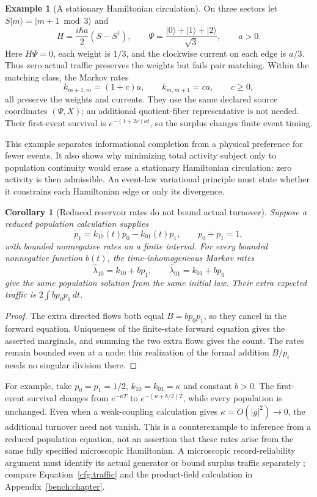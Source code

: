 \documentclass[11pt,oneside,openany]{book}
\newtheorem{corollary}[theorem]{Corollary}
\theoremstyle{definition}
\newtheorem{example}[theorem]{Example}
\theoremstyle{remark}\newtheorem{remark}[theorem]{Remark}
\begin{document}
\begin{example}[A stationary Hamiltonian circulation]\label{stat:ring}
On three sectors let $S|m\rangle=|m+1\bmod3\rangle$ and
\begin{equation}\label{stat:ring-hamiltonian}
 H=\frac{i\hbar a}{2}(S-S^\dagger),\qquad
 \Psi=\frac{|0\rangle+|1\rangle+|2\rangle}{\sqrt3},\qquad a>0.
\end{equation}
Here $H\Psi=0$, each weight is $1/3$, and the clockwise current on each
edge is $a/3$. Thus zero actual traffic preserves the weights but fails pair
matching. Within the matching class, the Markov rates
\begin{equation}\label{stat:ring-surplus}
 k_{m+1,m}=(1+c)a,\qquad k_{m,m+1}=ca,\qquad c\geq0,
\end{equation}
all preserve the weights and currents. They use the same declared source
coordinates $(\Psi,X)$; an additional quotient-fiber representative is not
needed. Their first-event survival is $e^{-(1+2c)at}$, so the surplus changes
finite event timing.
\end{example}

This example separates informational completion from a physical preference
for fewer events. It also shows why minimizing total activity subject only
to population continuity would erase a stationary Hamiltonian circulation:
zero activity is then admissible. An event-law variational principle must
state whether it constrains each Hamiltonian edge or only its divergence.

\begin{corollary}[Reduced reservoir rates do not bound actual turnover]
\label{stat:reservoir-turnover}
Suppose a reduced population calculation supplies
\[
 \dot p_1=k_{10}(t)p_0-k_{01}(t)p_1,\qquad p_0+p_1=1,
\]
with bounded nonnegative rates on a finite interval. For every bounded
nonnegative function $b(t)$, the time-inhomogeneous Markov rates
\[
 \widehat\lambda_{10}=k_{10}+b p_1,\qquad
 \widehat\lambda_{01}=k_{01}+b p_0
\]
give the same population solution from the same initial law. Their extra
expected traffic is $2\int b p_0p_1\,dt$.
\end{corollary}
\begin{proof}
The extra directed flows both equal $B=b p_0p_1$, so they cancel in the
forward equation. Uniqueness of the finite-state forward equation gives
the asserted marginals, and summing the two extra flows gives the count.
The rates remain bounded even at a node: this realization of the formal
addition $B/p_i$ needs no singular division there.
\end{proof}
For example, take $p_0=p_1=1/2$, $k_{10}=k_{01}=\kappa$ and constant
$b>0$. The first-event survival changes from $e^{-\kappa T}$ to
$e^{-(\kappa+b/2)T}$, while every population is unchanged. Even when a
weak-coupling calculation gives $\kappa=O(|g|^2)\to0$, the additional
turnover need not vanish. This is a counterexample to inference from a
reduced population equation, not an assertion that these rates arise
from the same fully specified microscopic Hamiltonian. A microscopic
record-reliability argument must identify its actual generator or bound
surplus traffic separately \cite{C03}; compare
Equation~\eqref{cfg:traffic} and the product-field calculation in
Appendix~\ref{bench:chapter}.
\end{document}
